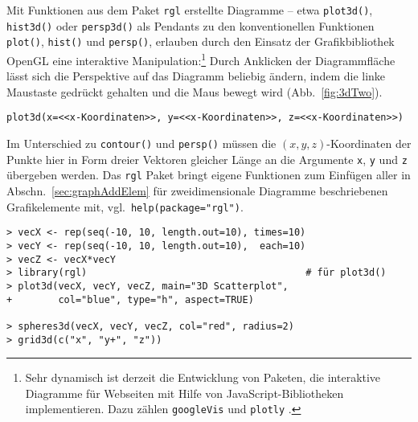 Mit Funktionen aus dem Paket \lstinline!rgl! \cite{Adler2011} erstellte Diagramme -- etwa \lstinline!plot3d()!, \lstinline!hist3d()! oder \lstinline!persp3d()! als Pendants zu den konventionellen Funktionen \lstinline!plot()!, \lstinline!hist()! und \lstinline!persp()!, erlauben durch den Einsatz der Grafikbibliothek OpenGL eine interaktive Manipulation:\footnote{ %
Sehr dynamisch ist derzeit die Entwicklung von Paketen, die interaktive Diagramme für Webseiten mit Hilfe von JavaScript-Bibliotheken implementieren. Dazu zählen \lstinline!googleVis! \cite{Gesmann2011} und \lstinline!plotly! \cite{Sievert2015,Sievert2020}.} Durch Anklicken der Diagrammfläche lässt sich die Perspektive auf das Diagramm beliebig ändern, indem die linke Maustaste gedrückt gehalten und die Maus bewegt wird (Abb.\ \ref{fig:3dTwo}).
\begin{lstlisting}
plot3d(x=<<x-Koordinaten>>, y=<<x-Koordinaten>>, z=<<x-Koordinaten>>)
\end{lstlisting}

Im Unterschied zu \lstinline!contour()! und \lstinline!persp()! müssen die $(x, y, z)$-Koordinaten der Punkte hier in Form dreier Vektoren gleicher Länge an die Argumente \lstinline!x!, \lstinline!y! und \lstinline!z! übergeben werden. Das \lstinline!rgl! Paket bringt eigene Funktionen zum Einfügen aller in Abschn.\ \ref{sec:graphAddElem} für zweidimensionale Diagramme beschriebenen Grafikelemente mit, vgl.\ \lstinline!help(package="rgl")!.
\begin{lstlisting}
> vecX <- rep(seq(-10, 10, length.out=10), times=10)
> vecY <- rep(seq(-10, 10, length.out=10),  each=10)
> vecZ <- vecX*vecY
> library(rgl)                                      # für plot3d()
> plot3d(vecX, vecY, vecZ, main="3D Scatterplot",
+        col="blue", type="h", aspect=TRUE)

> spheres3d(vecX, vecY, vecZ, col="red", radius=2)
> grid3d(c("x", "y+", "z"))
\end{lstlisting}

